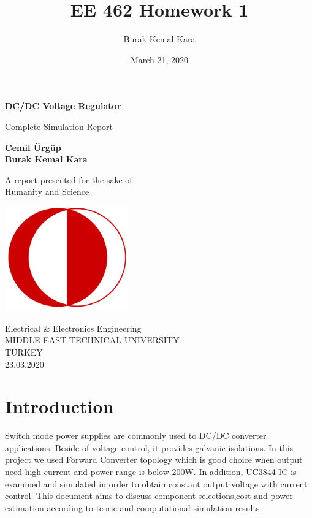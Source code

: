 \documentclass{article}
\title{EE 462 Homework 1}
\author{Burak Kemal Kara}
\date{March 21, 2020}
\begin{document}
\begin{titlepage}
    \begin{center}
        \vspace*{1cm}
            
        \Huge
        \textbf{DC/DC Voltage Regulator}
            
        \vspace{0.5cm}
        \LARGE
        Complete Simulation Report
            
        \vspace{1.5cm}
            
        \textbf{Cemil Ürgüp}\\
        \textbf{Burak Kemal Kara}
            
        \vfill
            
        A report presented for the sake of\\
        Humanity and Science
            
        \vspace{0.8cm}
            
        \includegraphics[width=0.4\textwidth]{logo.png}
            
        \Large
        Electrical \& Electronics Engineering\\
        MIDDLE EAST TECHNICAL UNIVERSITY\\
        TURKEY\\
        23.03.2020
            
    \end{center}
\end{titlepage}
\tableofcontents
\newpage
\section{Introduction}
Switch mode power supplies are commonly used to DC/DC converter applications. 
Beside of voltage control, it provides galvanic isolations. 
In this project we used Forward Converter topology which is good choice when output need high current and power range is below 200W. 
In addition, UC3844 IC is examined and simulated in order to obtain constant output voltage with current control.
This document aims to discuss component selections,cost and power estimation according to teoric and computational simulation results.
\end{document}
